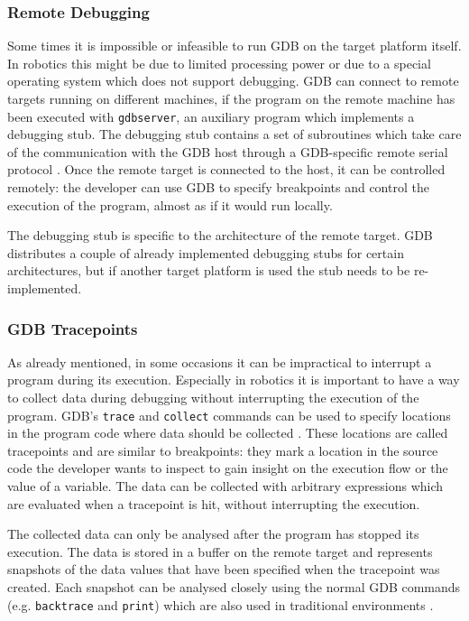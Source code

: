 \subsubsection{Remote Debugging}
Some times it is impossible or infeasible to run GDB on the target platform itself. In robotics this might be due to limited processing power or due to a special operating system which does not support debugging. GDB can connect to remote targets running on different machines, if the program on the remote machine has been executed with \verb+gdbserver+, an auxiliary program which implements a debugging stub. The debugging stub contains a set of subroutines which take care of the communication with the GDB host through a GDB-specific remote serial protocol \cite{Stallman2002}. Once the remote target is connected to the host, it can be controlled remotely: the developer can use GDB to specify breakpoints and control the execution of the program, almost as if it would run locally.

The debugging stub is specific to the architecture of the remote target. GDB distributes a couple of already implemented debugging stubs for certain architectures, but if another target platform is used the stub needs to be re-implemented.

\subsubsection{GDB Tracepoints}
As already mentioned, in some occasions it can be impractical to interrupt a program during its execution. Especially in robotics it is important to have a way to collect data during debugging without interrupting the execution of the program. GDB's \verb+trace+ and \verb+collect+ commands can be used to specify locations in the program code where data should be collected \cite{Stallman2002}. These locations are called tracepoints and are similar to breakpoints: they mark a location in the source code the developer wants to inspect to gain insight on the execution flow or the value of a variable. The data can be collected with arbitrary expressions which are evaluated when a tracepoint is hit, without interrupting the execution.

The collected data can only be analysed after the program has stopped its execution. The data is stored in a buffer on the remote target and represents snapshots of the data values that have been specified when the tracepoint was created. Each snapshot can be analysed closely using the normal GDB commands (e.g. \verb+backtrace+ and \verb+print+) which are also used in traditional environments \cite{Stallman2002}.

